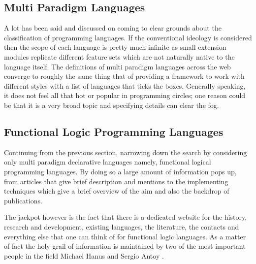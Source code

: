 \documentclass[thesis-solanki.tex]{subfiles}
\begin{document}
\subsection{Multi Paradigm Languages}

A lot has been said and discussed on
coming to clear grounds about the classification of programming languages.
If the conventional ideology
is considered then the scope of each language is pretty much infinite as small extension modules replicate
different feature sets which are not naturally native to the language itself.
The definitions of multi paradigm languages across the web
\cite{website:wikimultiparadigm,website:mdn,website:blogc2} converge to roughly the same thing that of providing a
framework to work with different styles with a list of languages \cite{website:wikimpllist,website:dmoz} that ticks
the boxes.
Generally speaking, it
does not feel all that hot or popular in programming circles; one reason could be that it
is a very broad topic and specifying details can clear the fog.

\subsection{Functional Logic Programming Languages}

Continuing from the previous section, narrowing down the search by considering only multi paradigm declarative
languages namely, functional logical programming languages.
By doing so a large amount of information pops up, from articles that give brief description and mentions
\cite{website:wikiflpl, website:wikiflpllist} to the implementing techniques \cite{website:imlpementingflpl} which
give a brief overview of the aim and also the backdrop of publications.

The jackpot however is the fact that there is a dedicated website \cite{website:funclogprog} for the history,
research and development, existing languages, the literature, the contacts and everything else that one can think
of for functional logic languages.
As a matter of fact the holy grail of information is maintained by two of the most important people in the field
Michael Hanus \cite{website:mhanus} and Sergio Antoy \cite{website:santoy}.
\end{document}
